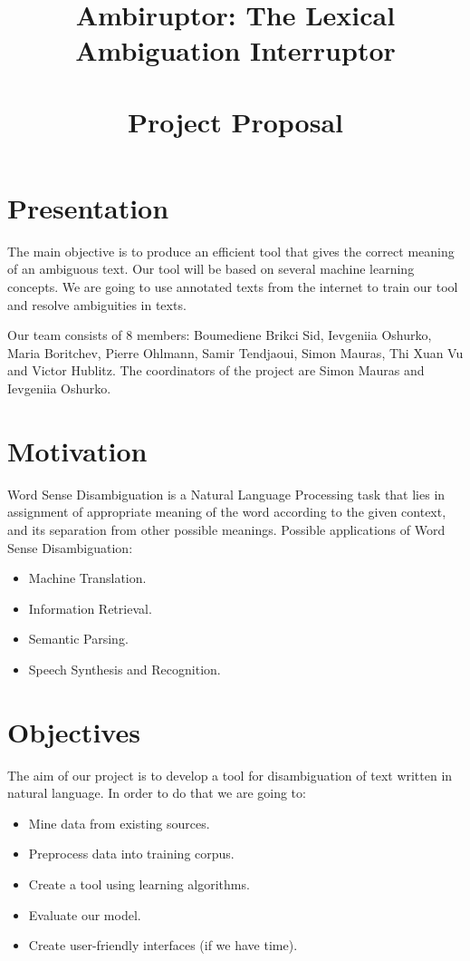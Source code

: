\documentclass[11pt,a4paper]{article}
\title{\textbf{Ambiruptor: The Lexical Ambiguation
    Interruptor}\\~\\Project Proposal}
\begin{document}
\maketitle

\vspace{1cm}
\section*{Presentation}

The main objective is to produce an efficient tool that gives the correct meaning of an ambiguous text. Our tool will be based on several machine learning concepts. We are going to use annotated texts from the internet to train our tool and resolve ambiguities in texts.

Our team consists of 8 members: Boumediene Brikci Sid, Ievgeniia Oshurko, Maria Boritchev, Pierre Ohlmann, Samir Tendjaoui, Simon Mauras, Thi Xuan Vu and Victor Hublitz. The coordinators of the project are Simon Mauras and Ievgeniia Oshurko.
\vspace{1cm}
\tableofcontents

\newpage

\section*{Motivation}

Word Sense Disambiguation is a Natural Language Processing task that lies in assignment of appropriate meaning of the word according to the given context, and its separation from other possible meanings.
Possible applications of Word Sense Disambiguation:
\begin{itemize}
	\item Machine Translation.
	\item Information Retrieval.
	\item Semantic Parsing.
	\item Speech Synthesis and Recognition.
\end{itemize}

\section{Objectives}

The aim of our project is to develop a tool for disambiguation of text written in natural language. In order to do that we are going to:
\begin{itemize}
	\item Mine data from existing sources.
	\item Preprocess data into training corpus.
	\item Create a tool using learning algorithms.
	\item Evaluate our model.
	\item Create user-friendly interfaces (if we have time).
\end{itemize}
\end{document}
